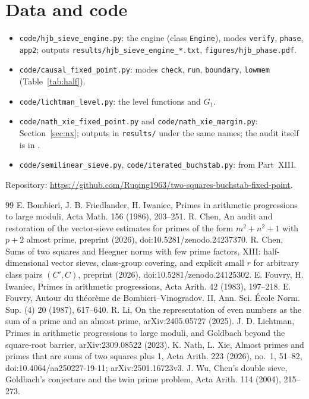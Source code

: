 \documentclass[11pt]{amsart}
\theoremstyle{remark}
\begin{document}
\section*{Data and code}
\begin{itemize}[leftmargin=1.5em]
\item \texttt{code/hjb\_sieve\_engine.py}: the engine (class \texttt{Engine}), modes \texttt{verify}, \texttt{phase}, \texttt{app2}; outputs \texttt{results/hjb\_sieve\_engine\_*.txt}, \texttt{figures/hjb\_phase.pdf}.
\item \texttt{code/causal\_fixed\_point.py}: modes \texttt{check}, \texttt{run}, \texttt{boundary}, \texttt{lowmem} (Table~\ref{tab:half}).
\item \texttt{code/lichtman\_level.py}: the level functions and $G_1$.
\item \texttt{code/nath\_xie\_fixed\_point.py} and \texttt{code/nath\_xie\_margin.py}: Section~\ref{sec:nx}; outputs in \texttt{results/} under the same names; the audit itself is in \cite{ChenNX}.
\item \texttt{code/semilinear\_sieve.py}, \texttt{code/iterated\_buchstab.py}: from Part~XIII.
\end{itemize}
Repository: \url{https://github.com/Ruqing1963/two-squares-buchstab-fixed-point}.

\begin{thebibliography}{99}
 E. Bombieri, J. B. Friedlander, H. Iwaniec, Primes in arithmetic progressions to large moduli, Acta Math. 156 (1986), 203--251.
 R. Chen, An audit and restoration of the vector-sieve estimates for primes of the form $m^2+n^2+1$ with $p+2$ almost prime, preprint (2026), doi:10.5281/zenodo.24237370.
 R. Chen, Sums of two squares and Heegner norms with few prime factors, XIII: half-dimensional vector sieves, class-group covering, and explicit small $r$ for arbitrary class pairs $(C',C)$, preprint (2026), doi:10.5281/zenodo.24125302.
 E. Fouvry, H. Iwaniec, Primes in arithmetic progressions, Acta Arith. 42 (1983), 197--218.
 E. Fouvry, Autour du th\'eor\`eme de Bombieri--Vinogradov. II, Ann. Sci. \'Ecole Norm. Sup. (4) 20 (1987), 617--640.
 R. Li, On the representation of even numbers as the sum of a prime and an almost prime, arXiv:2405.05727 (2025).
 J. D. Lichtman, Primes in arithmetic progressions to large moduli, and Goldbach beyond the square-root barrier, arXiv:2309.08522 (2023).
 K. Nath, L. Xie, Almost primes and primes that are sums of two squares plus 1, Acta Arith. 223 (2026), no.~1, 51--82, doi:10.4064/aa250227-19-11; arXiv:2501.16723v3.
 J. Wu, Chen's double sieve, Goldbach's conjecture and the twin prime problem, Acta Arith. 114 (2004), 215--273.
\end{thebibliography}
\end{document}
